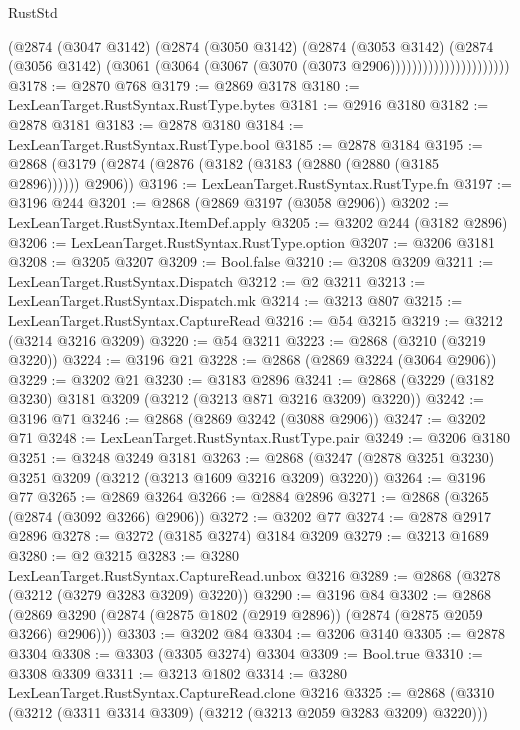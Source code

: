 \begin{lexlean}{RustStd}
\begin{coremodule}
{{{{{{{{{{{{{{{{{{{                              (@2874
                                (@3047 @3142)
                                (@2874
                                  (@3050 @3142)
                                  (@2874
                                    (@3053 @3142)
                                    (@2874
                                      (@3056 @3142)
                                      (@3061 (@3064 (@3067 (@3070 (@3073 @2906))))))))))))))))))))))
@3178 := @2870 @768
@3179 := @2869 @3178
@3180 := LexLeanTarget.RustSyntax.RustType.bytes
@3181 := @2916 @3180
@3182 := @2878 @3181
@3183 := @2878 @3180
@3184 := LexLeanTarget.RustSyntax.RustType.bool
@3185 := @2878 @3184
@3195 := @2868 (@3179 (@2874 (@2876 (@3182 (@3183 (@2880 (@2880 (@3185 @2896)))))) @2906))
@3196 := LexLeanTarget.RustSyntax.RustType.fn
@3197 := @3196 @244
@3201 := @2868 (@2869 @3197 (@3058 @2906))
@3202 := LexLeanTarget.RustSyntax.ItemDef.apply
@3205 := @3202 @244 (@3182 @2896)
@3206 := LexLeanTarget.RustSyntax.RustType.option
@3207 := @3206 @3181
@3208 := @3205 @3207
@3209 := Bool.false
@3210 := @3208 @3209
@3211 := LexLeanTarget.RustSyntax.Dispatch
@3212 := @2 @3211
@3213 := LexLeanTarget.RustSyntax.Dispatch.mk
@3214 := @3213 @807
@3215 := LexLeanTarget.RustSyntax.CaptureRead
@3216 := @54 @3215
@3219 := @3212 (@3214 @3216 @3209)
@3220 := @54 @3211
@3223 := @2868 (@3210 (@3219 @3220))
@3224 := @3196 @21
@3228 := @2868 (@2869 @3224 (@3064 @2906))
@3229 := @3202 @21
@3230 := @3183 @2896
@3241 := @2868 (@3229 (@3182 @3230) @3181 @3209 (@3212 (@3213 @871 @3216 @3209) @3220))
@3242 := @3196 @71
@3246 := @2868 (@2869 @3242 (@3088 @2906))
@3247 := @3202 @71
@3248 := LexLeanTarget.RustSyntax.RustType.pair
@3249 := @3206 @3180
@3251 := @3248 @3249 @3181
@3263 := @2868 (@3247 (@2878 @3251 @3230) @3251 @3209 (@3212 (@3213 @1609 @3216 @3209) @3220))
@3264 := @3196 @77
@3265 := @2869 @3264
@3266 := @2884 @2896
@3271 := @2868 (@3265 (@2874 (@3092 @3266) @2906))
@3272 := @3202 @77
@3274 := @2878 @2917 @2896
@3278 := @3272 (@3185 @3274) @3184 @3209
@3279 := @3213 @1689
@3280 := @2 @3215
@3283 := @3280 LexLeanTarget.RustSyntax.CaptureRead.unbox @3216
@3289 := @2868 (@3278 (@3212 (@3279 @3283 @3209) @3220))
@3290 := @3196 @84
@3302 := @2868 (@2869 @3290 (@2874 (@2875 @1802 (@2919 @2896)) (@2874 (@2875 @2059 @3266) @2906)))
@3303 := @3202 @84
@3304 := @3206 @3140
@3305 := @2878 @3304
@3308 := @3303 (@3305 @3274) @3304
@3309 := Bool.true
@3310 := @3308 @3309
@3311 := @3213 @1802
@3314 := @3280 LexLeanTarget.RustSyntax.CaptureRead.clone @3216
@3325 := @2868 (@3310 (@3212 (@3311 @3314 @3309) (@3212 (@3213 @2059 @3283 @3209) @3220)))
}}}}}}}}}}}}}}}}}}}
\end{coremodule}
\end{lexlean}
